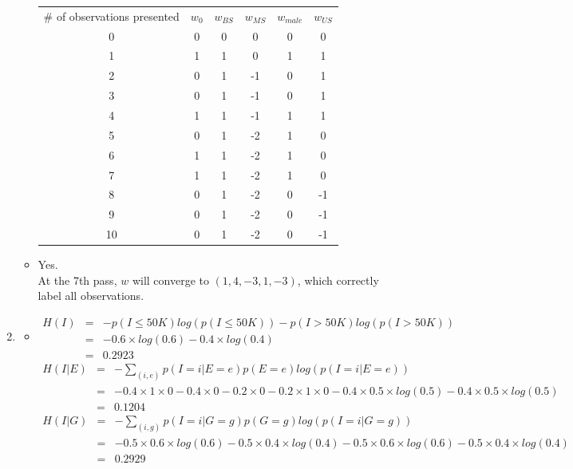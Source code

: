 \documentclass[11pt]{article}
\begin{document}
\begin{onehalfspace}
\begin{enumerate}[label=\alph*]
\begin{itemize}
\begin{tabular}{c | c  c  c  c  c}
			\# of observations presented & $w_0$ & $w_{BS}$ & $w_{MS}$ & $w_{male}$ & $w_{US}$\\
			0 & 0 & 0 & 0 & 0 & 0 \\ \hline
			1 & 1 & 1 & 0 & 1 & 1 \\ \hline
			2 & 0 & 1 & -1 & 0 & 1 \\ \hline
			3 & 0 & 1 & -1 & 0 & 1 \\ \hline
			4 & 1 & 1 & -1 & 1 & 1 \\ \hline
			5 & 0 & 1 & -2 & 1 & 0 \\ \hline
			6 & 1 & 1 & -2 & 1 & 0 \\ \hline
			7 & 1 & 1 & -2 & 1 & 0 \\ \hline
			8 & 0 & 1 & -2 & 0 & -1 \\ \hline
			9 & 0 & 1 & -2 & 0 & -1 \\ \hline
			10 & 0 & 1 & -2 & 0 & -1 \\ \hline
			\end{tabular}
		\item
		Yes.\\
		At the 7th pass, $w$ will converge to $(1,4,-3,1,-3)$, which correctly label all observations.
	\end{itemize}
	\item
	\begin{itemize}
		\item
		\begin{eqnarray*}
		H(I) &=& -p(I\leq50K)log(p(I\leq50K))-p(I>50K)log(p(I>50K))\\
			&=& -0.6 \times log(0.6) - 0.4 \times log(0.4)\\
			&=& 0.2923
		\end{eqnarray*}
		\begin{eqnarray*}
		H(I|E) &=& -\sum_{(i,e)}p(I=i|E=e)p(E=e)log(p(I=i|E=e))\\
			&=& -0.4\times1\times0-0.4\times0-0.2\times0-0.2\times1\times0-0.4\times0.5\times log(0.5)-0.4\times0.5\times log(0.5) \\ 
			&=& 0.1204
		\end{eqnarray*}
		\begin{eqnarray*}
		H(I|G) &=& -\sum_{(i,g)}p(I=i|G=g)p(G=g)log(p(I=i|G=g))\\
			&=& -0.5\times0.6\times log(0.6) - 0.5\times 0.4 \times log(0.4)  -0.5\times0.6\times log(0.6) - 0.5\times 0.4 \times log(0.4)\\
			&=& 0.2929
		\end{eqnarray*}
		\begin{eqnarray*}

\end{eqnarray*}
\end{itemize}
\end{enumerate}
\end{onehalfspace}
\end{document}
